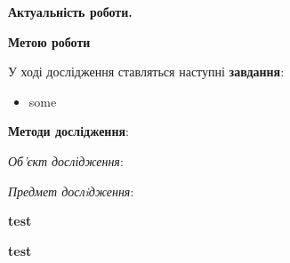 \intro
\pagestyle{plain}

\textbf{Актуальність роботи.} 


\textbf{Метою роботи} \cite{1512.03385}

У ході дослідження ставляться наступні \textbf{завдання}:

\begin{itemize}
    \item some

\end{itemize}

\textbf{Методи дослідження}: 

\emph{Об’єкт дослідження}: 

\emph{Предмет дослiдження}: 

\textbf{test}

\textbf{test}